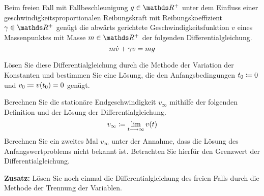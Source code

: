 \begin{atiTask}[
  title = Freier Fall mit Reibung
]
 Beim freien Fall mit Fallbeschleunigung $g\in\setR^+$ unter dem Einfluss einer geschwindigkeitsproportionalen Reibungskraft mit Reibungskoeffizient $\gamma\in\setR^+$ genügt die abwärts gerichtete Geschwindigkeitsfunktion $v$ eines Massenpunktes mit Masse $m\in\setR^+$ der folgenden Differentialgleichung.
 \[
   m\dot{v} + \gamma v = mg
 \]
 \begin{atiSubtasks}
   \item{
    Lösen Sie diese Differentialgleichung durch die Methode der Variation der Konstanten und bestimmen Sie eine Lösung, die den Anfangsbedingungen $t_0\coloneqq 0$ und $v_0\coloneqq v(t_0)=0$ genügt.
  }
  \item{
    Berechnen Sie die stationäre Endgeschwindigkeit $v_\infty$ mithilfe der folgenden Definition und der Lösung der Differentialgleichung.
    \[
      v_\infty \define \lim_{t\conv\infty}v(t)
    \]
    Berechnen Sie ein zweites Mal $v_\infty$ unter der Annahme, dass die Lösung des Anfangswertproblems nicht bekannt ist.
    Betrachten Sie hierfür den Grenzwert der Differentialgleichung.
  }
  \item{
    \textbf{Zusatz:}
    Lösen Sie noch einmal die Differentialgleichung des freien Falls durch die Methode der Trennung der Variablen.
  }
 \end{atiSubtasks}
\end{atiTask}
